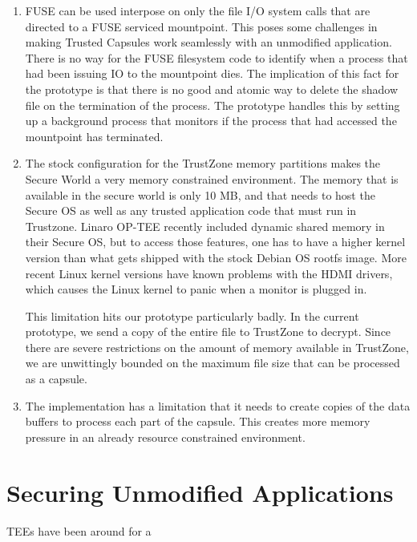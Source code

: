 \begin{enumerate}
    \item FUSE can be used interpose on only the file I/O system calls that are
directed to a FUSE serviced mountpoint. This poses some challenges in making
Trusted Capsules work seamlessly with an unmodified application.\\There is no
way for the FUSE filesystem code to identify when a process that had been
issuing IO to the mountpoint dies. The implication of this fact for the
prototype is that there is no good and atomic way to delete the shadow file on
the termination of the process. The prototype handles this by setting up a
background process that monitors if the process that had accessed the mountpoint
has terminated.
    \item The stock configuration for the TrustZone memory partitions makes the
Secure World a very memory constrained environment. The memory that is available
in the secure world is only 10 MB, and that needs to host the Secure OS as well
as any trusted application code that must run in Trustzone. Linaro OP-TEE
recently included dynamic shared memory in their Secure OS, but to access those
features, one has to have a higher kernel version than what gets shipped with
the stock Debian OS rootfs image. More recent Linux kernel versions have known
problems with the HDMI drivers, which causes the Linux kernel to panic when a
monitor is plugged in.

This limitation hits our prototype particularly badly. In the
current prototype, we send a copy of the entire file to TrustZone to decrypt.
Since there are severe restrictions on the amount of memory available in
TrustZone, we are unwittingly bounded on the maximum file size that can be
processed as a capsule.
    \item The implementation has a limitation that it
needs to create copies of the data buffers to process each part of the capsule.
This creates more memory pressure in an already resource constrained
environment. 
\end{enumerate}

\section{Securing Unmodified Applications}

TEEs have been around for a 
